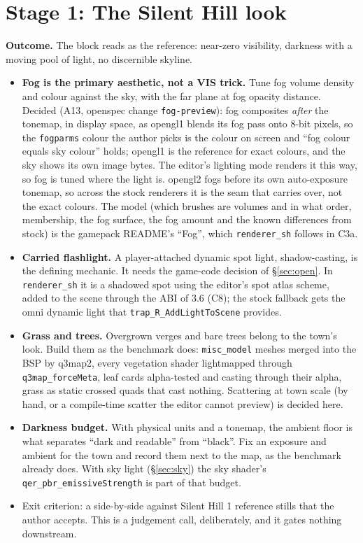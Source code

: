 \documentclass[11pt,a4paper]{article}
\begin{document}
\section{Stage 1: The Silent Hill look}

\textbf{Outcome.} The block reads as the reference: near-zero visibility, darkness with a moving
pool of light, no discernible skyline.

\begin{itemize}
\item \textbf{Fog is the primary aesthetic, not a VIS trick.} Tune fog volume density and colour
  against the sky, with the far plane at fog opacity distance. Decided (A13, openspec change
  \texttt{fog-preview}): fog composites \emph{after} the tonemap, in display space, as opengl1
  blends its fog pass onto 8-bit pixels, so the \texttt{fogparms} colour the author picks is the
  colour on screen and ``fog colour equals sky colour'' holds; opengl1 is the reference for exact
  colours, and the sky shows its own image bytes. The editor's lighting mode renders it this way, so
  fog is tuned where the light is. opengl2 fogs before its own auto-exposure tonemap, so across the
  stock renderers it is the seam that carries over, not the exact colours. The model (which brushes
  are volumes and in what order, membership, the fog surface, the fog amount and the known
  differences from stock) is the gamepack README's ``Fog'', which \texttt{renderer\_sh} follows in
  C3a.
\item \textbf{Carried flashlight.} A player-attached dynamic spot light, shadow-casting, is the
  defining mechanic. It needs the game-code decision of §\ref{sec:open}. In \texttt{renderer\_sh}
  it is a shadowed spot using the editor's spot atlas scheme, added to the scene through the ABI of
  3.6 (C8); the stock fallback gets the omni
  dynamic light that \texttt{trap\_R\_AddLightToScene} provides.
\item \textbf{Grass and trees.} Overgrown verges and bare trees belong to the town's look. Build
  them as the benchmark does: \texttt{misc\_model} meshes merged into the BSP by q3map2, every
  vegetation shader lightmapped through \texttt{q3map\_forceMeta}, leaf cards alpha-tested and casting
  through their alpha, grass as static crossed quads that cast nothing. Scattering at town scale
  (by hand, or a compile-time scatter the editor cannot preview) is decided here.
\item \textbf{Darkness budget.} With physical units and a tonemap, the ambient floor is what
  separates ``dark and readable'' from ``black''. Fix an exposure and ambient for the town and
  record them next to the map, as the benchmark already does. With sky light (§\ref{sec:sky}) the
  sky shader's \texttt{qer\_pbr\_emissiveStrength} is part of that budget.
\item Exit criterion: a side-by-side against Silent Hill 1 reference stills that the author
  accepts. This is a judgement call, deliberately, and it gates nothing downstream.
\end{itemize}
\end{document}
